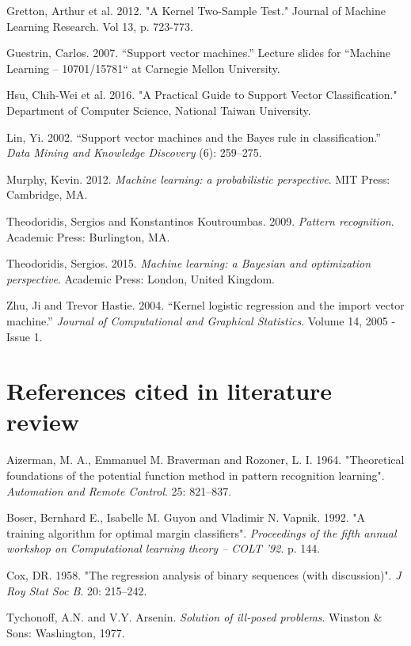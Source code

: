 \documentclass[letterpaper, 11pt]{article}
\begin{document}
Gretton, Arthur et al. 2012. "A Kernel Two-Sample Test." Journal of Machine Learning Research. Vol 13, p. 723-773.

Guestrin, Carlos. 2007. ``Support vector machines.'' Lecture slides for ``Machine Learning – 10701/15781`` at Carnegie Mellon University. 

Hsu, Chih-Wei et al. 2016. "A Practical Guide to Support Vector Classification." Department of Computer Science, National Taiwan University.

Lin, Yi. 2002. ``Support vector machines and the Bayes rule in classification.'' \emph{Data Mining and Knowledge Discovery} (6): 259–275.

Murphy, Kevin. 2012. \emph{Machine learning: a probabilistic perspective}. MIT Press: Cambridge, MA.

Theodoridis, Sergios and Konstantinos Koutroumbas. 2009. \emph{Pattern recognition}. Academic Press: Burlington, MA.

Theodoridis, Sergios. 2015. \emph{Machine learning: a Bayesian and optimization perspective}. Academic Press: London, United Kingdom.

Zhu, Ji and Trevor Hastie. 2004. ``Kernel logistic regression and the import vector machine.'' \emph{Journal of Computational and Graphical Statistics}.  
Volume 14, 2005 - Issue 1.

\section{References cited in literature review}

Aizerman, M. A., Emmanuel M. Braverman and Rozoner, L. I. 1964. "Theoretical foundations of the potential function method in pattern recognition learning". \emph{Automation and Remote Control}. 25: 821–837.

Boser, Bernhard E., Isabelle M. Guyon and Vladimir N. Vapnik. 1992. "A training algorithm for optimal margin classifiers". \emph{Proceedings of the fifth annual workshop on Computational learning theory – COLT '92}. p. 144.

Cox, DR. 1958. "The regression analysis of binary sequences (with discussion)". \emph{J Roy Stat Soc B}. 20: 215–242.

Tychonoff, A.N. and V.Y. Arsenin. \emph{Solution of ill-posed problems}. Winston \& Sons: Washington, 1977.
\end{document}
